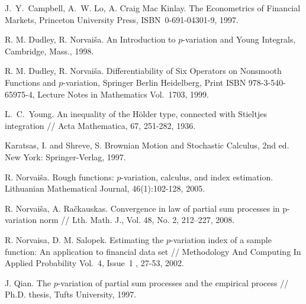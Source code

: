 \documentclass[12pt, a4paper]{article}
\numberwithin{equation}{section}
\begin{document}
  
  
\begin{thebibliography}{99}  

J.~Y.~Campbell, A.~W. Lo, A. Craig Mac Kinlay. The
Econometrics of Financial Markets, Princeton University Press, 
ISBN~0-691-04301-9, 1997.

R. M. Dudley, R. Norvai\v{s}a. An Introduction to
$p$-variation and Young Integrals, Cambridge, Mass., 1998.

R. M. Dudley, R. Norvai\v{s}a. Differentiability of 
Six Operators on Nonsmooth Functions and $p$-variation, 
Springer Berlin Heidelberg, 
Print ISBN 978-3-540-65975-4, Lecture Notes in Mathematics Vol.~1703, 1999.


L.~C.~Young. An inequality of the Hölder type, 
connected with Stieltjes integration
// Acta Mathematica, 67, 251-282, 1936.

Karatsas, I. and Shreve, S. Brownian Motion and Stochastic Calculus, 2nd ed. New York: Springer-Verlag, 1997. 

R. Norvaiša. Rough functions: $p$-variation, calculus, and index estimation. Lithuanian Mathematical Journal, 46(1):102-128, 2005.
  
R. Norvaiša, A. Račkauskas. Convergence in law of partial sum processes in p-variation norm // Lth. Math. J., Vol. 48, No. 2, 212–227, 2008.
  
R. Norvaisa, D. M. Salopek.
Estimating the $p$-variation index of a sample function: 
An application to financial data set //
Methodology And Computing In Applied Probability 
Vol.~4, Issue~1 , 27-53, 2002.   

J. Qian. The $p$-variation of partial sum processes and the empirical process // Ph.D. thesis, Tufts University, 1997.
  

\end{thebibliography}
\end{document}
